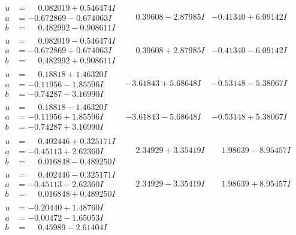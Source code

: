 \documentclass[1p]{elsarticle_modified}
\theoremstyle{definition}
\begin{document}
$$\begin{array}{c|c|c}
\begin{aligned}
u &= \phantom{-}0.082019 + 0.546474 I \\
a &= -0.672869 - 0.674063 I \\
b &= \phantom{-}0.482992 - 0.908611 I\end{aligned}
 & \phantom{-}0.39608 - 2.87985 I & -0.41340 + 6.09142 I \\ \hline\begin{aligned}
u &= \phantom{-}0.082019 - 0.546474 I \\
a &= -0.672869 + 0.674063 I \\
b &= \phantom{-}0.482992 + 0.908611 I\end{aligned}
 & \phantom{-}0.39608 + 2.87985 I & -0.41340 - 6.09142 I \\ \hline\begin{aligned}
u &= \phantom{-}0.18818 + 1.46320 I \\
a &= -0.11956 - 1.85596 I \\
b &= -0.74287 - 3.16990 I\end{aligned}
 & -3.61843 + 5.68648 I & -0.53148 - 5.38067 I \\ \hline\begin{aligned}
u &= \phantom{-}0.18818 - 1.46320 I \\
a &= -0.11956 + 1.85596 I \\
b &= -0.74287 + 3.16990 I\end{aligned}
 & -3.61843 - 5.68648 I & -0.53148 + 5.38067 I \\ \hline\begin{aligned}
u &= \phantom{-}0.402446 + 0.325171 I \\
a &= -0.45113 + 2.62360 I \\
b &= \phantom{-}0.016848 - 0.489250 I\end{aligned}
 & \phantom{-}2.34929 + 3.35419 I & \phantom{-}1.98639 - 8.95457 I \\ \hline\begin{aligned}
u &= \phantom{-}0.402446 - 0.325171 I \\
a &= -0.45113 - 2.62360 I \\
b &= \phantom{-}0.016848 + 0.489250 I\end{aligned}
 & \phantom{-}2.34929 - 3.35419 I & \phantom{-}1.98639 + 8.95457 I \\ \hline\begin{aligned}
u &= -0.20440 + 1.48760 I \\
a &= -0.00472 - 1.65053 I \\
b &= \phantom{-}0.45989 - 2.61404 I\end{aligned}

\end{array}$$
\end{document}
